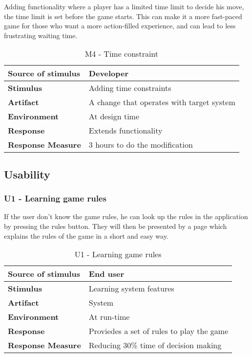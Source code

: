 Adding functionality where a player has a limited time limit to decide his move, the time limit is set before the game starts. This can make it a more fast-paced game for those who want a more action-filled experience, and can lead to less frustrating waiting time.

\begin{table}[h!]
\begin{tabular}{ | p{110pt} | p{250pt}  |}
\hline
\bf Source of stimulus &  Developer  \\ \hline
\bf Stimulus & Adding time constraints \\ \hline 
\bf Artifact & A change that operates with target system  \\  \hline
\bf Environment & At design time \\ \hline
\bf Response & Extends functionality \\ \hline
\bf Response Measure & 3 hours to do the modification \\ \hline

\end{tabular}
\caption{M4 - Time constraint}
\end{table}

\subsection{Usability}

\subsubsection{U1 - Learning game rules}

If the user don't know the game rules, he can look up the rules in the application by pressing the rules button. They will then be presented by a page which explains the rules of the game in a short and easy way.

\begin{table}[h!]
\begin{tabular}{ | p{110pt} | p{250pt}  |}
\hline
\bf Source of stimulus &  End user  \\ \hline
\bf Stimulus & Learning system features \\ \hline 
\bf Artifact & System  \\  \hline
\bf Environment & At run-time \\ \hline
\bf Response & Proviedes a set of rules to play the game \\ \hline
\bf Response Measure & Reducing 30\% time of decision making \\ \hline

\end{tabular}
\caption{U1 - Learning game rules}
\end{table}

